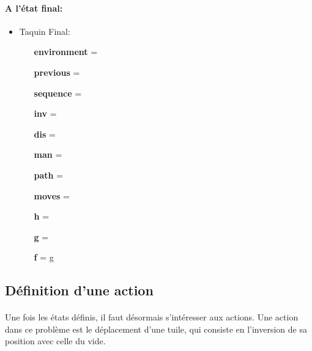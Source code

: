 \documentclass[10pt,a4paper]{report}
\begin{document}
\paragraph{A l’état final:}
\begin{itemize}
\item Taquin Final:
\begin{enumerate}
\item [{\ttfamily\bfseries environment} =] {\color{gray}{\em L'environnement est toujours le même, seul l'état final est ajouté à la liste \ttfamily end}}
\item [{\ttfamily\bfseries previous} =] {\color{gray}{\em L'avant-dernier état}}
\item [{\ttfamily\bfseries sequence} =] {\ttfamily [1, 2, 3, 4, 5, 6, 7, 8, 0]}
\item [{\ttfamily\bfseries inv} =] {}
\item [{\ttfamily\bfseries dis} =] {}
\item [{\ttfamily\bfseries man} =] {}
\item [{\ttfamily\bfseries path} =] {\color{gray}{\em Le chemin minimal depuis l'état initial jusqu'à cet état}}
\item [{\ttfamily\bfseries moves} =] {\ttfamily ["R"]}
\item [{\ttfamily\bfseries h} =] {}
\item [{\ttfamily\bfseries g} =] {\color{gray}{\em La longueur du chemin minimal}}
\item [{\ttfamily\bfseries f} =] {\ttfamily g}
\end{enumerate}
\end{itemize}
\subsection{Définition d’une action}
\paragraph{}{Une fois les états définis, il faut désormais s’intéresser aux actions. Une action dans ce problème est le déplacement d’une tuile, qui consiste en l'inversion de sa position avec celle du vide.}
\end{document}
